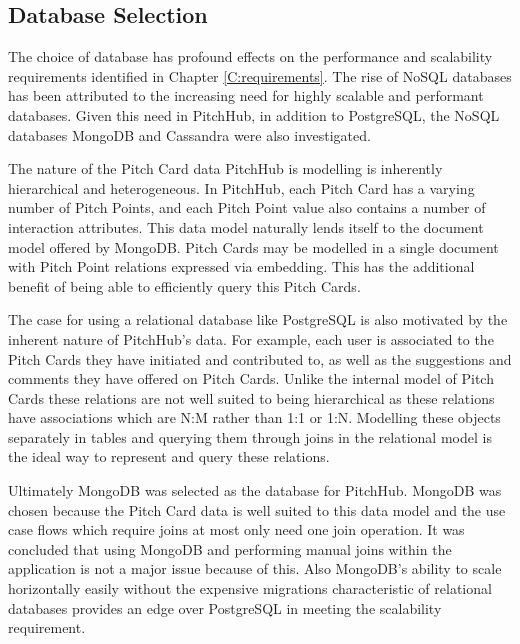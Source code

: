 \subsection{Database Selection}

The choice of database has profound effects on the performance and scalability requirements identified in Chapter \ref{C:requirements}. The rise of NoSQL databases has been attributed to the increasing need for highly scalable and performant databases. Given this need in PitchHub, in addition to PostgreSQL, the NoSQL databases MongoDB and Cassandra were also investigated.
\par
The nature of the Pitch Card data PitchHub is modelling is inherently hierarchical and heterogeneous. In PitchHub, each Pitch Card has a varying number of Pitch Points, and each Pitch Point value also contains a number of interaction attributes. This data model naturally lends itself to the document model offered by MongoDB. Pitch Cards may be modelled in a single document with Pitch Point relations expressed via embedding. This has the additional benefit of being able to efficiently query this Pitch Cards.
\par
The case for using a relational database like PostgreSQL is also motivated by the inherent nature of PitchHub's data. For example, each user is associated to the Pitch Cards they have initiated and contributed to, as well as the suggestions and comments they have offered on Pitch Cards. Unlike the internal model of Pitch Cards these relations are not well suited to being hierarchical as these relations have associations which are N:M rather than 1:1 or 1:N. Modelling these objects separately in tables and querying them through joins in the relational model is the ideal way to represent and query these relations.
\par
Ultimately MongoDB was selected as the database for PitchHub. MongoDB was chosen because the Pitch Card data is well suited to this data model and the use case flows which require joins at most only need one join operation. It was concluded that using MongoDB and performing manual joins within the application is not a major issue because of this. Also MongoDB's ability to scale horizontally easily without the expensive migrations characteristic of relational databases provides an edge over PostgreSQL in meeting the scalability requirement.

